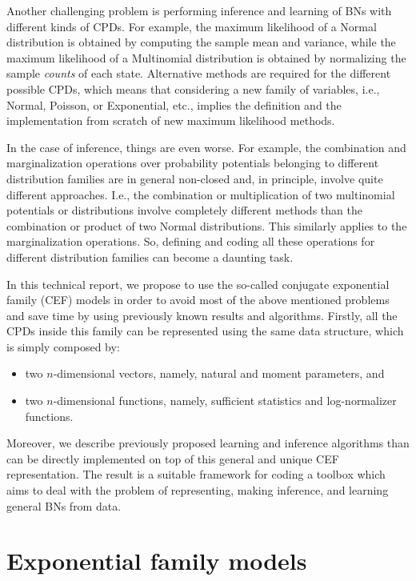 \documentclass[11pt, oneside]{article}   	%
\numberwithin{figure}{section}
\numberwithin{equation}{section}
\numberwithin{table}{section}
\theoremstyle{definition}
\begin{document}
Another challenging problem is performing inference and learning of BNs with different kinds of CPDs. For example, the maximum likelihood of a Normal distribution is obtained by computing the sample mean and variance, while the maximum likelihood of a Multinomial distribution is obtained by normalizing the sample \textit{counts} of each state. Alternative methods are required for the different possible CPDs, which means that considering a new family of variables, i.e., Normal, Poisson, or Exponential, etc., implies the definition and the implementation from scratch of new maximum likelihood methods.  

In the case of inference, things are even worse. For example, the combination and marginalization operations over probability potentials belonging to different distribution families are in general non-closed and, in principle, involve quite different approaches. I.e., the combination or multiplication of two multinomial potentials or distributions involve completely different methods than the combination or product of two Normal distributions. This similarly applies to the marginalization operations. So, defining and coding all these operations for different distribution families can become a daunting task. 

In this technical report, we propose to use the so-called conjugate exponential family (CEF) models in order to avoid most of the above mentioned problems and save time by using previously known results and algorithms. Firstly, all the CPDs inside this family can be represented using the same data structure, which is simply composed by: 

\begin{itemize}
\item two $n$-dimensional vectors, namely, natural and moment parameters, and
\item two $n$-dimensional functions, namely, sufficient statistics and log-normalizer functions.
\end{itemize}

Moreover, we describe previously proposed learning and inference algorithms than can be directly implemented on top of this general and unique CEF representation. The result is a suitable framework for coding a toolbox which aims to deal with the problem of representing, making inference, and learning general BNs from data.

\section{Exponential family models}\label{sec:ef}
\end{document}
